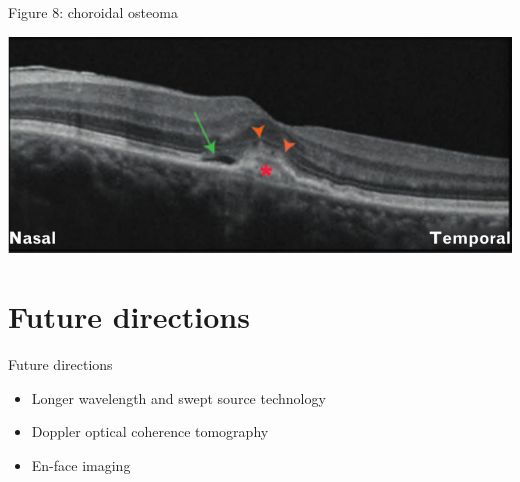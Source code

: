 \documentclass{beamer}
\begin{document}
\begin{frame}{Figure 8: choroidal osteoma}
    \begin{center}
        \includegraphics[width=\textwidth]{8.png}
    \end{center}
\end{frame}

\section{Future directions}
\begin{frame}{Future directions}
    \begin{itemize}
        \item Longer wavelength and swept source technology
        \item Doppler optical coherence tomography
        \item En-face imaging
    \end{itemize}
\end{frame}
\end{document}
